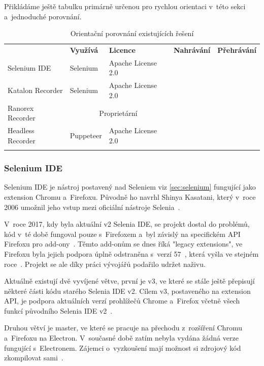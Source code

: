 \documentclass[12pt, a4paper, twoside]{article}
\newcommand{\cmark}{\ding{51}}
\newcommand{\xmark}{\ding{55}}
\begin{document}
	Přikládáme ještě tabulku primárně určenou pro rychlou orientaci v~této sekci a~jednoduché porovnání.
{
	\begin{longtable}{ l|l|l|c|c } 
		\rowcolor{tableHeadingBackground} \multicolumn{1}{l}{\textbf{Název}} & \multicolumn{1}{l}{\textbf{Využívá}} & \multicolumn{1}{l}{\textbf{Licence}} & \multicolumn{1}{l}{\textbf{Nahrávání}} & \multicolumn{1}{l}{\textbf{Přehrávání}} \\
		Selenium IDE & Selenium & Apache License 2.0 & \cmark & \cmark \\
		Katalon Recorder & Selenium & Apache License 2.0 & \cmark & \cmark \\
		Ranorex Recorder & \multicolumn{2}{c}{Proprietární} & \cmark & \cmark \\
		Headless Recorder & Puppeteer & Apache License 2.0 & \cmark & \xmark \\
		\caption{Orientační porovnání existujících řešení}
	\end{longtable}
}
	\subsubsection{Selenium IDE}
	Selenium IDE je nástroj postavený nad Seleniem viz \ref{sec:selenium} fungující jako extension Chromu a~Firefoxu. Původně ho navrhl Shinya Kasatani, který v~roce 2006 umožnil jeho vstup mezi oficiální nástroje Selenia~\cite{seleniumHistory, seleniumIdeGithub}.
	
	V~roce 2017, kdy byla aktuální v2 Selenia IDE, se projekt dostal do problémů, kód v~té době fungoval pouze s~Firefoxem a~byl závislý na specifickém API Firefoxu pro add-ony~\cite{seleniumWhyUse}. Těmto add-onům se dnes říká "legacy extensions", ve Firefoxu byla jejich podpora úplně odstraněna s~verzí 57~\cite{firefoxLegacyExtensions}, která vyšla ve stejném roce~\cite{firefoxReleaseCalendar}. Projekt se ale díky práci vývojářů podařilo udržet naživu.
	
	Aktuálně existují dvě vyvíjené větve, první je v3, ve které se stále ještě přepisují některé části kódu starého Selenia IDE v2. Cílem v3, postaveného na extension API, je podpora aktuálních verzí prohlížečů Chrome a~Firefox včetně všech funkcí původního Selenia IDE v2~\cite{seleniumIdeGithub}.
	
	Druhou větví je master, ve které se pracuje na přechodu z~rozšíření Chromu a~Firefoxu na Electron. V~současné době zatím nebyla vydána žádná verze fungující s~Electronem. Zájemci o~vyzkoušení mají možnost si zdrojový kód zkompilovat sami~\cite{seleniumIdeGithub}.
	
\end{document}
